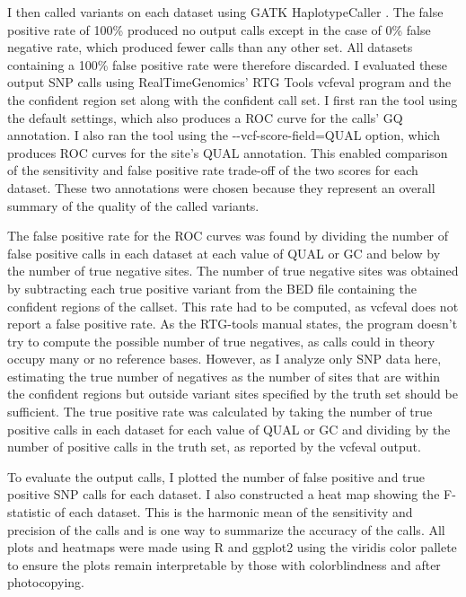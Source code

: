 I then called variants on each dataset using GATK HaplotypeCaller \parencite{poplin_scaling_2018}. The false positive rate of 100\% produced no output calls except in the case of 0\% false negative rate, which produced fewer calls than any other set. All datasets containing a 100\% false positive rate were therefore discarded. I evaluated these output SNP calls using RealTimeGenomics' RTG Tools vcfeval program \parencite{cleary_comparing_2015} and the the confident region set along with the confident call set. I first ran the tool using the default settings, which also produces a ROC curve for the calls' GQ annotation. I also ran the tool using the -\phantom{}-vcf-score-field=QUAL option, which produces ROC curves for the site's QUAL annotation. This enabled comparison of the sensitivity and false positive rate trade-off of the two scores for each dataset. These two annotations were chosen because they represent an overall summary of the quality of the called variants.

The false positive rate for the ROC curves was found by dividing the number of false positive calls in each dataset at each value of QUAL or GC and below by the number of true negative sites. The number of true negative sites was obtained by subtracting each true positive variant from the BED file containing the confident regions of the callset. This rate had to be computed, as vcfeval does not report a false positive rate. As the RTG-tools manual states, the program doesn't try to compute the possible number of true negatives, as calls could in theory occupy many or no reference bases. However, as I analyze only SNP data here,  estimating the true number of negatives as the number of sites that are within the confident regions but outside variant sites specified by the truth set should be sufficient. The true positive rate was calculated by taking the number of true positive calls in each dataset for each value of QUAL or GC and dividing by the number of positive calls in the truth set, as reported by the vcfeval output.

To evaluate the output calls, I plotted the number of false positive and true positive SNP calls for each dataset. I also constructed a heat map showing the F-statistic of each dataset. This is the harmonic mean of the sensitivity and precision of the calls and is one way to summarize the accuracy of the calls. All plots and heatmaps were made using R \parencite{r_core_2020} and ggplot2 \parencite{wickham_ggplot2_2016} using the viridis color pallete \parencite{garnier_viridis_2018} to ensure the plots remain interpretable by those with colorblindness and after photocopying.

